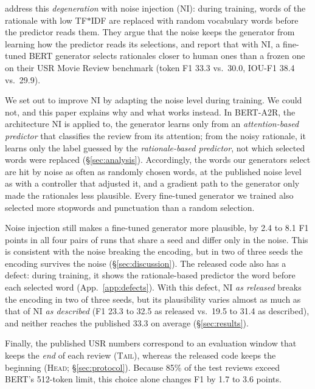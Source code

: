 \documentclass[11pt]{article}
\newcommand{\HEAD}{\textup{\textsc{Head}}}
\newcommand{\TAIL}{\textup{\textsc{Tail}}}
\newcommand{\tfidf}{TF$\ast$IDF}
\begin{document}
\citet{storek-etal-2023-unsupervised} address this \emph{degeneration} with noise injection (NI): during training, words of the rationale with low \tfidf{} are replaced with random vocabulary words before the predictor reads them. They argue that the noise keeps the generator from learning how the predictor reads its selections, and report that with NI, a fine-tuned BERT generator \citep{devlin-etal-2019-bert} selects rationales closer to human ones than a frozen one on their USR Movie Review benchmark (token F1 33.3 vs.\ 30.0, IOU-F1 38.4 vs.\ 29.9).

We set out to improve NI by adapting the noise level during training. We could not, and this paper explains why and what works instead. In BERT-A2R, the architecture NI is applied to, the generator learns only from an \emph{attention-based predictor} that classifies the review from its attention; from the noisy rationale, it learns only the label guessed by the \emph{rationale-based predictor}, not which selected words were replaced (\S\ref{sec:analysis}). Accordingly, the words our generators select are hit by noise as often as randomly chosen words, at the published noise level as with a controller that adjusted it, and a gradient path to the generator only made the rationales less plausible. Every fine-tuned generator we trained also selected more stopwords and punctuation than a random selection.

Noise injection still makes a fine-tuned generator more plausible, by 2.4 to 8.1 F1 points in all four pairs of runs that share a seed and differ only in the noise. This is consistent with the noise breaking the encoding, but in two of three seeds the encoding survives the noise (\S\ref{sec:discussion}). The released code also has a defect: during training, it shows the rationale-based predictor the word before each selected word (App.~\ref{app:defects}). With this defect, NI \emph{as released} breaks the encoding in two of three seeds, but its plausibility varies almost as much as that of NI \emph{as described} (F1 23.3 to 32.5 as released vs.\ 19.5 to 31.4 as described), and neither reaches the published 33.3 on average (\S\ref{sec:results}).

Finally, the published USR numbers correspond to an evaluation window that keeps the \emph{end} of each review (\TAIL), whereas the released code keeps the beginning (\HEAD; \S\ref{sec:protocol}). Because 85\% of the test reviews exceed BERT's 512-token limit, this choice alone changes F1 by 1.7 to 3.6 points.
\end{document}
